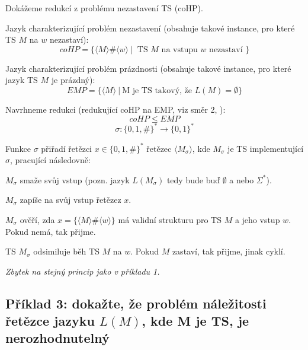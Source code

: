 \begin{compactitem}
    \item Dokážeme redukcí z problému nezastavení TS (coHP).

    \item Jazyk charakterizující problém nezastavení (obsahuje takové instance, pro které TS $M$ na $w$ nezastaví):
    $$ coHP = \{ \langle M \rangle \# \langle w \rangle ~|~ \text{ TS } M \text{ na vstupu } w \text{ nezastaví } \} $$

    \item Jazyk charakterizující problém prázdnosti (obsahuje takové instance, pro které jazyk TS $M$ je prázdný):
    $$ EMP = \{ \langle M \rangle ~|~ \text{M je TS takový, že } L(M) = \emptyset \} $$

    \item Navrhneme redukci (redukující coHP na EMP, viz směr 2, ):
    $$ coHP \leq EMP $$
    $$ \sigma : \{ 0, 1, \# \}^* \rightarrow \{ 0, 1 \}^* $$

    \item Funkce $\sigma$ přiřadí řetězci $x \in \{ 0, 1, \# \}^*$ řetězec $\langle M_{\sigma} \rangle$, kde $M_{\sigma}$ je TS implementující $\sigma$, pracující následovně: \begin{compactitem}
        \item $M_{\sigma}$ smaže svůj vstup (pozn. jazyk $L(M_{\sigma})$ tedy bude buď $\emptyset$ a nebo $\Sigma^*$).

        \item $M_{\sigma}$ zapíše na svůj vstup řetězez $x$.

        \item $M_{\sigma}$ ověří, zda $x = \{ \langle M \rangle \# \langle w \rangle \}$ má validní strukturu pro TS $M$ a jeho vstup $w$. Pokud nemá, tak přijme.

        \item TS $M_{\sigma}$ odsimiluje běh TS $M$ na $w$. Pokud $M$ zastaví, tak přijme, jinak cyklí.
    \end{compactitem}

    \item \textit{Zbytek na stejný princip jako v příkladu 1.}
\end{compactitem}

\subsection*{Příklad 3: dokažte, že problém náležitosti řetězce jazyku $L(M)$, kde M je TS, je nerozhodnutelný}

